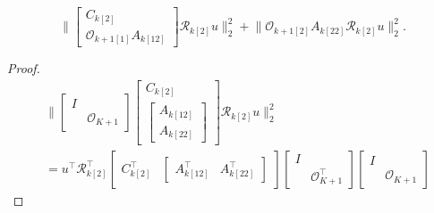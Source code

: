\documentclass[doctype=mastersthesis,BCOR=15mm,biblatex]{ldvbook}%
\newcommand{\R}{\mathcal{R}} %
\newcommand{\Ob}{\mathcal{O}} %
\newcommand{\eye}{I} %
\begin{document}
\begin{equation}
\Big\|
\begin{bmatrix}
C_{k[2]}\\
\Ob_{k+1[1]}A_{k[12]}
\end{bmatrix}  \R_{k[2]} u
\Big\|_2^2
+
\Big\|
\Ob_{k+1[2]}A_{k[22]}
 \R_{k[2]} u
\Big\|_2^2
.
\end{equation}
\begin{proof}
\begin{align}
		&\Bigg\|
	\begin{bmatrix}
	\eye & \\
	& \Ob_{K+1}
	\end{bmatrix}
	\begin{bmatrix}
	C_{k[2]}\\
	\begin{bmatrix}
	A_{k[12]}\\
	A_{k[22]}
	\end{bmatrix}
	\end{bmatrix}  \R_{k[2]} u\Bigg\|_2^2
	\\
	&=
	u^\top
	\R_{k[2]}^\top
	\begin{bmatrix}
	C_{k[2]}^\top&
	\begin{bmatrix}
	A_{k[12]}^\top&
	A_{k[22]}^\top
	\end{bmatrix}
	\end{bmatrix} 
	\begin{bmatrix}
	\eye & \\
	& \Ob_{K+1}^\top
	\end{bmatrix} 
	\begin{bmatrix}
	\eye & \\
	& \Ob_{K+1}
	\end{bmatrix}

\end{align}
\end{proof}
\end{document}
